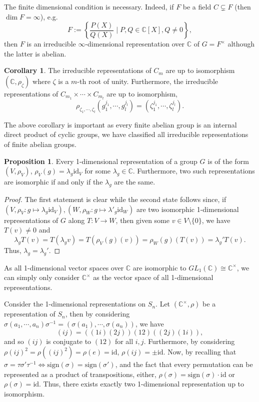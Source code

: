 \documentclass[]{article}
\theoremstyle{definition}
\newtheorem{corollary}{Corollary}[theorem]
\theoremstyle{definition}
\newtheorem{proposition}{Proposition}[section]
\begin{document}
The finite dimensional condition is necessary. Indeed, if \(F\) be a field 
\(C \subsetneq F\) (then \(\dim F = \infty\)), e.g. 
\[F := \left\{\frac{P(X)}{Q(X)} \mid P, Q \in \mathbb{C}[X], Q \neq 0 \right\},\]
then \(F\) is an irreducible \(\infty\)-dimensional representation over \(\mathbb{C}\)
of \(G = F^\times\) although the latter is abelian. 

\begin{corollary}
  The irreducible representations of \(C_m\) are up to isomorphism  
  \((\mathbb{C}, \rho_\zeta)\) where \(\zeta\) is a \(m\)-th root of unity.
  Furthermore, the irreducible representations of \(C_{m_1} \times \cdots \times 
  C_{m_l}\) are up to isomorphism,
  \[\rho_{\zeta_1, \cdots, \zeta_l}(g_1^{j_1}, \cdots, g_l^{j_l}) = 
    (\zeta_1^{j_1}, \cdots, \zeta_l^{j_l}).\]
\end{corollary}

The above corollary is important as every finite abelian group is an internal 
direct product of cyclic groups, we have classified all irreducible representations 
of finite abelian groups.

\begin{proposition}
  Every 1-dimensional representation of a group \(G\) is of the form 
  \((V, \rho_V)\), \(\rho_V(g) = \lambda_g \text{id}_V\) for some 
  \(\lambda_g \in \mathbb{C}\). Furthermore, two such representations are isomorphic 
  if and only if the \(\lambda_g\) are the same.
\end{proposition}
\begin{proof}
  The first statement is clear while the second state follows since, if 
  \((V, \rho_V : g \mapsto \lambda_g \text{id}_V), 
    (W, \rho_W : g \mapsto \lambda'_g \text{id}_W)\) are two isomorphic 
  1-dimensional representations of \(G\) along \(T : V \to W\), then given some 
  \(v \in V \setminus \{0\}\), we have \(T(v) \neq 0\) and
  \[\lambda_g T(v) = T(\lambda_g v) = T(\rho_V(g)(v)) = \rho_W(g)(T(v)) = 
    \lambda_g' T(v).\]
  Thus, \(\lambda_g = \lambda_g'\).
\end{proof}

As all 1-dimensional vector spaces over \(\mathbb{C}\) are isomorphic to 
\(GL_1(\mathbb{C}) \cong \mathbb{C}^\times\), we can simply only consider 
\(\mathbb{C}^\times\) as the vector space of all 1-dimensional representations.

Consider the 1-dimensional representations on \(S_n\). Let \((\mathbb{C}^\times, \rho)\)
be a representation of \(S_n\), then by considering 
\(\sigma(a_1, \cdots, a_n)\sigma^{-1} = (\sigma(a_1), \cdots, \sigma(a_n))\), we 
have 
\[(ij) = ((1i)(2j))(12)((2j)(1i)),\]
and so \((ij)\) is conjugate to \((12)\) for all \(i, j\). Furthermore, by considering 
\(\rho(ij)^2 = \rho((ij)^2) = \rho(e) = \text{id}\), \(\rho(ij) = \pm \text{id}\).
Now, by recalling that 
\(\sigma = \tau \sigma' \tau^{-1} \iff \text{sign}(\sigma) = \text{sign}(\sigma')\), 
and the fact that every permutation can be represented as a product of transpositions, 
either, \(\rho(\sigma) = \text{sign}(\sigma) \cdot \text{id}\) or 
\(\rho(\sigma) = \text{id}\). Thus, there exists exactly two 1-dimensional 
representation up to isomorphism.
\end{document}
